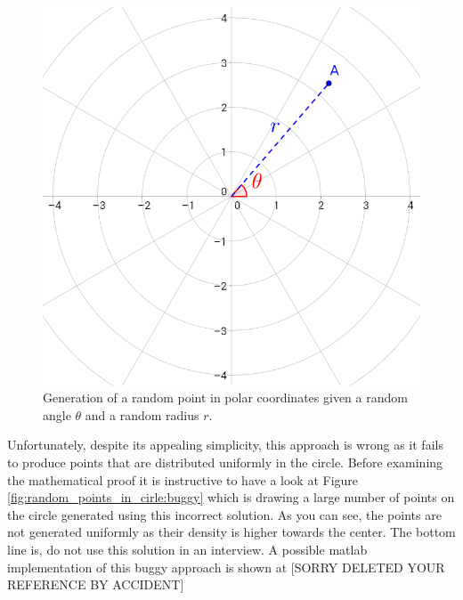 \begin{figure}
	\label{fig:random_points_in_cirle:polar_coordinates}
	\centering
	\includegraphics[scale=0.3]{sources/random_points_in_circle/images/polar-coordinate}
	\caption{Generation of a random point in polar coordinates given a random angle $\theta$ and a random radius $r$.}
\end{figure}

Unfortunately, despite its appealing simplicity, this approach is wrong as it fails to produce points that are  distributed uniformly in the circle. Before examining the mathematical proof it is instructive to have a look at Figure \ref{fig:random_points_in_cirle:buggy} which is drawing a large number of points on the circle generated using this incorrect solution. As you can see,  the points are not generated uniformly as their density is higher towards the center. 
The bottom line is, do not use this solution in an interview. A possible matlab implementation of this buggy approach is shown at [SORRY DELETED YOUR REFERENCE BY ACCIDENT]



